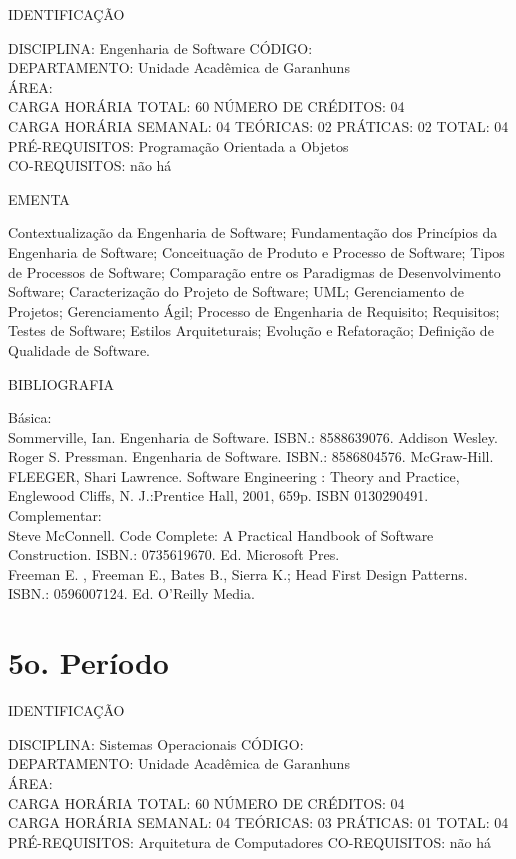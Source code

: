 \documentclass[
	12pt,				%
	openright,			%
  oneside,     %
	a4paper,			%
	chapter=TITLE,		%
	english,			%
	french,				%
	spanish,			%
	brazil				%
	]{abntex2}
\begin{document}
\begin{apendicesenv}
\newpage IDENTIFICAÇÃO

DISCIPLINA: Engenharia de Software CÓDIGO:\\ 
DEPARTAMENTO: Unidade Acadêmica de Garanhuns\\
ÁREA: \\
CARGA HORÁRIA TOTAL: 60 NÚMERO DE CRÉDITOS: 04\\
CARGA HORÁRIA SEMANAL: 04 TEÓRICAS: 02 PRÁTICAS: 02 TOTAL: 04\\
PRÉ-REQUISITOS: Programação Orientada a Objetos\\
CO-REQUISITOS: não há

EMENTA 

Contextualização da Engenharia de Software; Fundamentação dos Princípios
da Engenharia de Software; Conceituação de Produto e Processo de
Software; Tipos de Processos de Software; Comparação entre os
Paradigmas de Desenvolvimento Software; Caracterização do Projeto de
Software; UML; Gerenciamento de Projetos; Gerenciamento Ágil; Processo
de Engenharia de Requisito; Requisitos; Testes de Software; Estilos
Arquiteturais; Evolução e Refatoração; Definição de Qualidade de
Software.

BIBLIOGRAFIA 

Básica:\\
Sommerville, Ian. Engenharia de Software. ISBN.: 8588639076. Addison 
Wesley.\\
Roger S. Pressman. Engenharia de Software. ISBN.: 8586804576.
McGraw-Hill.\\
FLEEGER, Shari Lawrence. Software Engineering : Theory and Practice,
Englewood Cliffs, N. J.:Prentice Hall, 2001, 659p. ISBN 0130290491.\\
Complementar:\\
Steve McConnell. Code Complete: A Practical Handbook of Software
Construction. ISBN.: 0735619670. Ed. Microsoft Pres.\\
Freeman E. , Freeman E., Bates B., Sierra K.; Head First Design
Patterns. ISBN.: 0596007124. Ed. O'Reilly Media.\
\newpage 

\section*{5o. Período}

IDENTIFICAÇÃO

DISCIPLINA: Sistemas Operacionais CÓDIGO:\\ 
DEPARTAMENTO: Unidade Acadêmica de Garanhuns\\
ÁREA: \\
CARGA HORÁRIA TOTAL: 60 NÚMERO DE CRÉDITOS: 04\\
CARGA HORÁRIA SEMANAL: 04 TEÓRICAS: 03 PRÁTICAS: 01 TOTAL: 04\\
PRÉ-REQUISITOS: Arquitetura de Computadores 
CO-REQUISITOS: não há


\end{apendicesenv}
\end{document}
